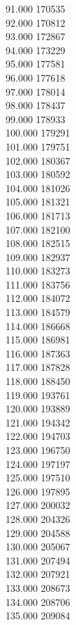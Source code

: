 { 91.000	170535 \\
 92.000	170812 \\
 93.000	172867 \\
 94.000	173229 \\
 95.000	177581 \\
 96.000	177618 \\
 97.000	178014 \\
 98.000	178437 \\
 99.000	178933 \\
 100.000	179291 \\
 101.000	179751 \\
 102.000	180367 \\
 103.000	180592 \\
 104.000	181026 \\
 105.000	181321 \\
 106.000	181713 \\
 107.000	182100 \\
 108.000	182515 \\
 109.000	182937 \\
 110.000	183273 \\
 111.000	183756 \\
 112.000	184072 \\
 113.000	184579 \\
 114.000	186668 \\
 115.000	186981 \\
 116.000	187363 \\
 117.000	187828 \\
 118.000	188450 \\
 119.000	193761 \\
 120.000	193889 \\
 121.000	194342 \\
 122.000	194703 \\
 123.000	196750 \\
 124.000	197197 \\
 125.000	197510 \\
 126.000	197895 \\
 127.000	200032 \\
 128.000	204326 \\
 129.000	204588 \\
 130.000	205067 \\
 131.000	207494 \\
 132.000	207921 \\
 133.000	208673 \\
 134.000	208706 \\
 135.000	209084 \\
}
